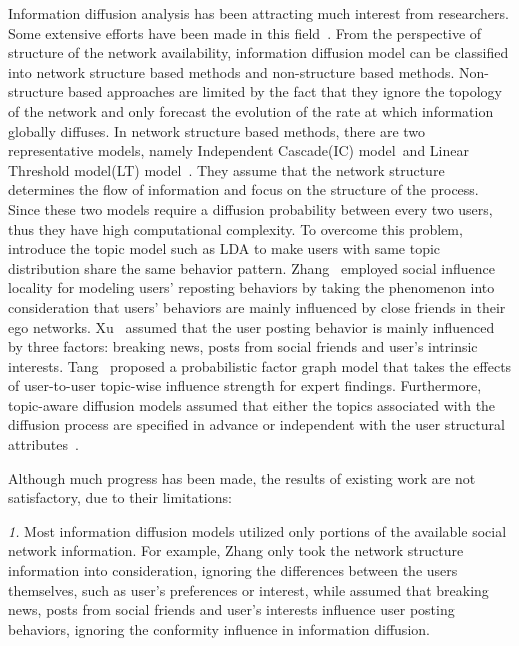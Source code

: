 \documentclass[runningheads,a4paper]{llncs}
\begin{document}
Information diffusion analysis has been attracting much interest from researchers. Some extensive efforts have been made in this field~\cite{xu2012modeling,Zhang2014Role}. From the perspective of structure of the network availability, information diffusion model can be classified into network structure based  methods and non-structure based methods. Non-structure based approaches are limited by the fact that they ignore the
topology of the network and only forecast the evolution of the rate at which information globally diffuses\cite{Aslay2014Online}.
In network structure based methods, there are two representative models, namely Independent Cascade(IC) model~\cite{Goldenberg2001Talk}and Linear Threshold model(LT) model~\cite{granovetter1978threshold}. They assume that the network structure determines the flow of information and focus on the structure of the process. Since these two models  require a diffusion probability between every two users, thus they have high computational complexity. To overcome this problem, ~\cite{Zhang2014Role,xu2012modeling} introduce the topic model such as LDA \cite{blei2003latent} to make users with same topic distribution share the same behavior pattern.
Zhang~\cite{Zhang2013Social} employed social influence locality  for modeling users' reposting behaviors by taking the phenomenon into consideration that users' behaviors are mainly influenced by close friends in their ego networks. Xu~\cite{xu2012modeling} assumed that the user posting behavior is mainly influenced by three factors: breaking news, posts from social friends and user's intrinsic interests. Tang~\cite{Tang2009Social} proposed a probabilistic factor graph model that takes the effects of user-to-user topic-wise influence strength for expert findings. Furthermore, topic-aware diffusion models assumed that either the topics associated with the diffusion process are specified in advance or independent with the user structural attributes~\cite{Chen2015Online}.

 Although much progress has been made, the results of existing work are not satisfactory, due to their limitations:

 \emph{1.} Most information diffusion models utilized only portions of the available social network information. For example, Zhang \cite{Zhang2013Social} only took the network structure information into consideration, ignoring the differences between the users themselves, such as user's preferences or interest, while \cite{xu2012modeling} assumed that breaking news, posts from social friends and user's interests influence user posting behaviors, ignoring the conformity influence in information diffusion.
\end{document}
